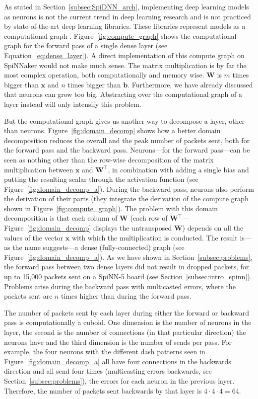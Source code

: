 \documentclass[]{article}
\begin{document}
As stated in Section~\ref{subsec:SpiDNN_arch}, implementing deep
learning models as neurons is not the current trend in deep learning
research and is not practiced by state-of-the-art deep learning
libraries.
These libraries represent models as a computational graph
\citep{goodfellow_et_al_2016, abadi_et_al_2015}.
Figure~\ref{fig:compute_graph} shows the computational graph for
the forward pass of a single dense layer (see
Equation~\ref{eq:dense_layer}).
A direct implementation of this compute graph on SpiNNaker would not
make much sense.
The matrix multiplication is by far the most complex operation, both
computationally and memory wise.
$\mathbf{W}$ is $m$ times bigger than $\mathbf{x}$ and $n$ times
bigger than $\mathbf{b}$.
Furthermore, we have already discussed that neurons can grow too big.
Abstracting over the computational graph of a layer instead will only
intensify this problem.

But the computational graph gives us another way to decompose a layer,
other than neurons.
Figure~\ref{fig:domain_decomp} shows how a better domain decomposition
reduces the overall and the peak number of packets sent, both for
the forward pass and the backward pass.
Neurons---for the forward pass---can be seen as nothing other than the
row-wise decomposition of the matrix multiplication between
$\mathbf{x}$ and $\mathbf{W}^\top$, in combination with adding a
single bias and putting the resulting scalar through the activation
function (see Figure~\ref{fig:domain_decomp_a}).
During the backward pass, neurons also perform the derivation of their
parts (they integrate the derivation of the compute graph shown in
Figure~\ref{fig:compute_graph}).
The problem with this domain decomposition is that each column of
$\mathbf{W}$ (each row of
$\mathbf{W}^\top$---Figure~\ref{fig:domain_decomp} displays the
untransposed $\mathbf{W}$) depends on all the values
of the vector $\mathbf{x}$ with which the multiplication is conducted.
The result is---as the name suggests---a dense (fully-connected)
graph (see Figure~\ref{fig:domain_decomp_a}).
As we have shown in Section~\ref{subsec:problems}, the forward pass
between two dense layers did not result in dropped packets, for up
to 15,000 packets sent on a SpiNN-5 board (see
Section~\ref{subsec:intro_spinn}).
Problems arise during the backward pass with multicasted errors, where
the packets sent are $n$ times higher than during the forward pass.

The number of packets sent by each layer during either the forward
or backward pass is computationally a cuboid.
One dimension is the number of neurons in the layer, the second is
the number of connections (in that particular direction) the neurons
have and the third dimension is the number of sends per pass.
For example, the four neurons with the different dash patterns seen in
Figure~\ref{fig:domain_decomp_a} all have four connections in the
backwards direction and all send four times (multicasting errors
backwards, see Section~\ref{subsec:problems}), the errors for each
neuron in the previous layer.
Therefore, the number of packets sent backwards by that layer is
$4 \cdot 4 \cdot 4 = 64$.
\end{document}
